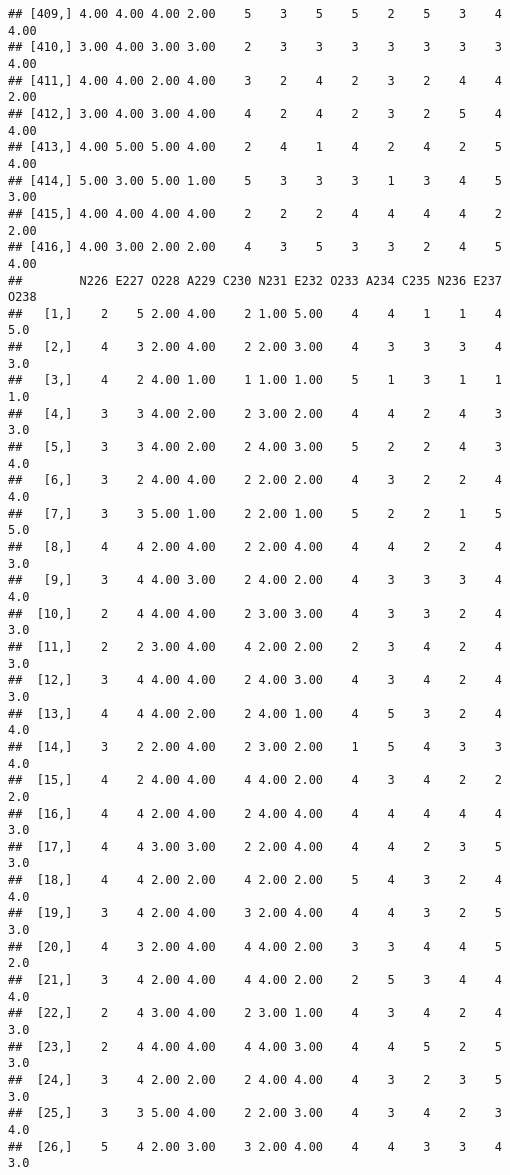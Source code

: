 \documentclass[]{article}
\begin{document}
\begin{verbatim}
## [409,] 4.00 4.00 4.00 2.00    5    3    5    5    2    5    3    4 4.00
## [410,] 3.00 4.00 3.00 3.00    2    3    3    3    3    3    3    3 4.00
## [411,] 4.00 4.00 2.00 4.00    3    2    4    2    3    2    4    4 2.00
## [412,] 3.00 4.00 3.00 4.00    4    2    4    2    3    2    5    4 4.00
## [413,] 4.00 5.00 5.00 4.00    2    4    1    4    2    4    2    5 4.00
## [414,] 5.00 3.00 5.00 1.00    5    3    3    3    1    3    4    5 3.00
## [415,] 4.00 4.00 4.00 4.00    2    2    2    4    4    4    4    2 2.00
## [416,] 4.00 3.00 2.00 2.00    4    3    5    3    3    2    4    5 4.00
##        N226 E227 O228 A229 C230 N231 E232 O233 A234 C235 N236 E237 O238
##   [1,]    2    5 2.00 4.00    2 1.00 5.00    4    4    1    1    4  5.0
##   [2,]    4    3 2.00 4.00    2 2.00 3.00    4    3    3    3    4  3.0
##   [3,]    4    2 4.00 1.00    1 1.00 1.00    5    1    3    1    1  1.0
##   [4,]    3    3 4.00 2.00    2 3.00 2.00    4    4    2    4    3  3.0
##   [5,]    3    3 4.00 2.00    2 4.00 3.00    5    2    2    4    3  4.0
##   [6,]    3    2 4.00 4.00    2 2.00 2.00    4    3    2    2    4  4.0
##   [7,]    3    3 5.00 1.00    2 2.00 1.00    5    2    2    1    5  5.0
##   [8,]    4    4 2.00 4.00    2 2.00 4.00    4    4    2    2    4  3.0
##   [9,]    3    4 4.00 3.00    2 4.00 2.00    4    3    3    3    4  4.0
##  [10,]    2    4 4.00 4.00    2 3.00 3.00    4    3    3    2    4  3.0
##  [11,]    2    2 3.00 4.00    4 2.00 2.00    2    3    4    2    4  3.0
##  [12,]    3    4 4.00 4.00    2 4.00 3.00    4    3    4    2    4  3.0
##  [13,]    4    4 4.00 2.00    2 4.00 1.00    4    5    3    2    4  4.0
##  [14,]    3    2 2.00 4.00    2 3.00 2.00    1    5    4    3    3  4.0
##  [15,]    4    2 4.00 4.00    4 4.00 2.00    4    3    4    2    2  2.0
##  [16,]    4    4 2.00 4.00    2 4.00 4.00    4    4    4    4    4  3.0
##  [17,]    4    4 3.00 3.00    2 2.00 4.00    4    4    2    3    5  3.0
##  [18,]    4    4 2.00 2.00    4 2.00 2.00    5    4    3    2    4  4.0
##  [19,]    3    4 2.00 4.00    3 2.00 4.00    4    4    3    2    5  3.0
##  [20,]    4    3 2.00 4.00    4 4.00 2.00    3    3    4    4    5  2.0
##  [21,]    3    4 2.00 4.00    4 4.00 2.00    2    5    3    4    4  4.0
##  [22,]    2    4 3.00 4.00    2 3.00 1.00    4    3    4    2    4  3.0
##  [23,]    2    4 4.00 4.00    4 4.00 3.00    4    4    5    2    5  3.0
##  [24,]    3    4 2.00 2.00    2 4.00 4.00    4    3    2    3    5  3.0
##  [25,]    3    3 5.00 4.00    2 2.00 3.00    4    3    4    2    3  4.0
##  [26,]    5    4 2.00 3.00    3 2.00 4.00    4    4    3    3    4  3.0

\end{verbatim}
\end{document}
